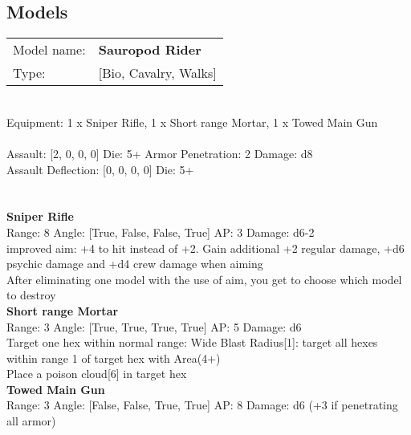 \pagebreak

\subsection{ Models }

\begin{tabular}{ll}
Model name: & {\bf Sauropod Rider } \\
Type: & [Bio, Cavalry, Walks] \\
\end{tabular}
\ \\
Equipment: 1 x Sniper Rifle, 1 x Short range Mortar, 1 x Towed Main Gun \\
\ \\
Assault: [2, 0, 0, 0] Die: 5+ Armor Penetration: 2 Damage: d8 \\
Assault Deflection: [0, 0, 0, 0] Die: 5+\\
\indent  
\ \\

\ \\
{\bf Sniper Rifle } \\



Range: 8  Angle: [True, False, False, True] AP: 3 Damage: d6-2 \\
improved aim: +4 to hit instead of +2. Gain additional +2 regular damage, +d6 psychic damage and +d4 crew damage when aiming\\ 
After eliminating one model with the use of aim, you get to choose which model to destroy\\ 




{\bf Short range Mortar } \\



Range: 3  Angle: [True, True, True, True] AP: 5 Damage: d6 \\
Target one hex within normal range: Wide Blast Radius[1]: target all hexes within range 1 of target hex with Area(4+)\\ 
Place a poison cloud[6] in target hex\\ 




{\bf Towed Main Gun } \\



Range: 3  Angle: [False, False, True, True] AP: 8 Damage: d6 (+3 if penetrating all armor) \\




